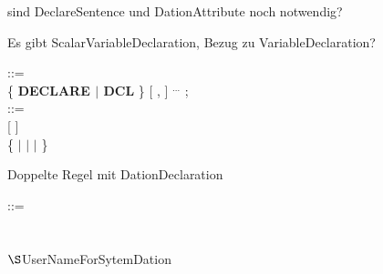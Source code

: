

 
















\begin{discuss}
sind DeclareSentence und DationAttribute noch notwendig?

Es gibt ScalarVariableDeclaration, Bezug zu VariableDeclaration?

 ::=\\
\x \{ {\bf DECLARE $\mid$ DCL} \}  [ ,  ] $^{...}$ ;\\

 ::=\\
\x {} [  ]\\
\x \{  $\mid$  $\mid$  $\mid$  \}\\ 
\end{discuss}


\begin{discuss}
Doppelte Regel mit DationDeclaration

 ::=\\
\x {}\\
\\
\x {} \kw{(} $\S $UserNameForSytemDation \kw{)}

\end{discuss}







 
